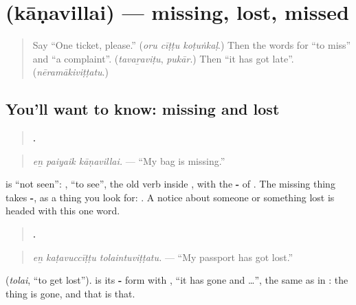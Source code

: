 \section[\texorpdfstring{\ta{காணவில்லை} (kāṇavillai)}{காணவில்லை (kāṇavillai)}]{ (kāṇavillai) — missing, lost, missed}

\label{lesson:TA-C289-kanavillai}



\begin{quote}
Say \textquotedblleft{}One ticket, please.\textquotedblright{} (\emph{oru cīṭṭu koṭuṅkaḷ}.) Then the words for \textquotedblleft{}to miss\textquotedblright{} and \textquotedblleft{}a complaint\textquotedblright{}. (\emph{tavaṟaviṭu}, \emph{pukār}.) Then \textquotedblleft{}it has got late\textquotedblright{}. (\emph{nēramākiviṭṭatu}.)
\end{quote}

\subsection*{You'll want to know: missing and lost}
\begin{quote}
\textbf{  .}
\end{quote}

\begin{quote}
\emph{eṉ paiyaik kāṇavillai.} — \textquotedblleft{}My bag is missing.\textquotedblright{}
\end{quote}

\textbf{} is \textquotedblleft{}not seen\textquotedblright{}: \textbf{}, \textquotedblleft{}to see\textquotedblright{}, the old verb inside \textbf{ }, with the \textbf{-} of \textbf{}. The missing thing takes \textbf{-}, as a thing you look for: \textbf{}. A notice about someone or something lost is headed with this one word.

\begin{quote}
\textbf{  .}
\end{quote}

\begin{quote}
\emph{eṉ kaṭavuccīṭṭu tolaintuviṭṭatu.} — \textquotedblleft{}My passport has got lost.\textquotedblright{}
\end{quote}

\textbf{} (\emph{tolai}, \textquotedblleft{}to get lost\textquotedblright{}). \textbf{} is its \textbf{-} form with \textbf{}, \textquotedblleft{}it has gone and …\textquotedblright{}, the same \textbf{} as in \textbf{}: the thing is gone, and that is that.

